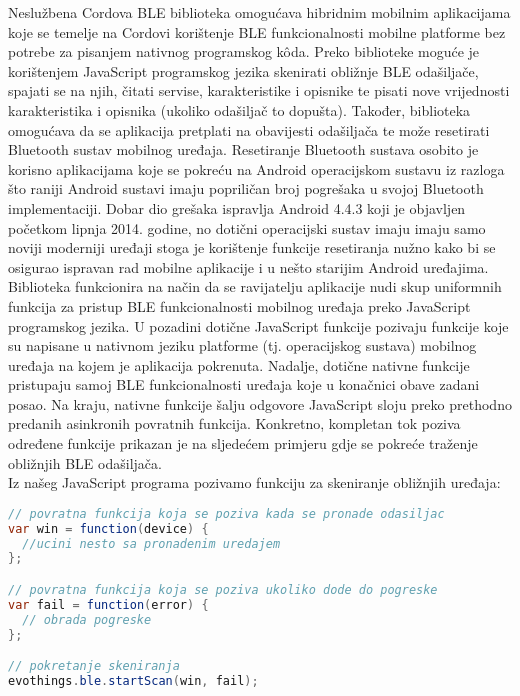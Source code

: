 Neslužbena Cordova BLE biblioteka omogućava hibridnim mobilnim aplikacijama koje se temelje na Cordovi korištenje BLE funkcionalnosti mobilne platforme bez potrebe za pisanjem nativnog programskog kôda. 
Preko biblioteke moguće je korištenjem JavaScript programskog jezika skenirati obližnje BLE odašiljače, spajati se na njih, čitati servise, karakteristike i opisnike te pisati nove vrijednosti karakteristika i opisnika (ukoliko odašiljač to dopušta). 
Također, biblioteka omogućava da se aplikacija pretplati na obavijesti odašiljača te može resetirati Bluetooth sustav mobilnog uređaja. 
Resetiranje Bluetooth sustava osobito je korisno aplikacijama koje se pokreću na Android operacijskom sustavu iz razloga što raniji Android sustavi imaju popriličan broj pogrešaka u svojoj Bluetooth implementaciji. 
Dobar dio grešaka ispravlja Android 4.4.3 koji je objavljen početkom lipnja 2014. godine, no dotični operacijski sustav imaju imaju samo noviji moderniji uređaji stoga je korištenje funkcije resetiranja nužno kako bi se osigurao ispravan rad mobilne aplikacije i u nešto starijim Android uređajima.
\\

Biblioteka funkcionira na način da se ravijatelju aplikacije nudi skup uniformnih funkcija za pristup BLE funkcionalnosti mobilnog uređaja preko JavaScript programskog jezika. 
U pozadini dotične JavaScript funkcije pozivaju funkcije koje su napisane u nativnom jeziku platforme (tj. operacijskog sustava) mobilnog uređaja na kojem je aplikacija pokrenuta. 
Nadalje, dotične nativne funkcije pristupaju samoj BLE funkcionalnosti uređaja koje u konačnici obave zadani posao. 
Na kraju, nativne funkcije šalju odgovore JavaScript sloju preko prethodno predanih asinkronih povratnih funkcija.
Konkretno, kompletan tok poziva određene funkcije prikazan je na sljedećem primjeru gdje se pokreće traženje obližnjih BLE odašiljača.
\\

Iz našeg JavaScript programa pozivamo funkciju za skeniranje obližnjih uređaja:
\begin{lstlisting}[language=java, morekeywords={var,function}]
// povratna funkcija koja se poziva kada se pronade odasiljac
var win = function(device) {
  //ucini nesto sa pronadenim uredajem
};

// povratna funkcija koja se poziva ukoliko dode do pogreske
var fail = function(error) {
  // obrada pogreske
};

// pokretanje skeniranja
evothings.ble.startScan(win, fail);
\end{lstlisting}

